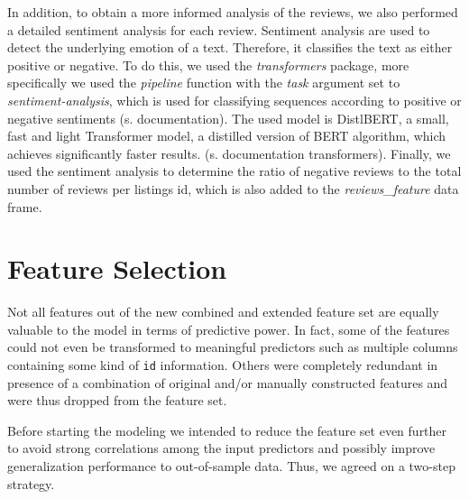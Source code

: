 \documentclass[12pt, letterpaper]{article}
\begin{document}
In addition, to obtain a more informed analysis of the reviews, we also performed a detailed sentiment analysis for each review. Sentiment analysis are used to detect the underlying emotion of a text. Therefore, it classifies the text as either positive or negative. 
To do this, we used the \textit{transformers} package, more specifically we used the \textit{pipeline} function 
with the \textit{task} argument set to \textit{sentiment-analysis}, which is used for classifying sequences
according to positive or negative sentiments (s. documentation). The used model is DistlBERT, 
a small, fast and light Transformer model, a distilled version of BERT algorithm, which achieves significantly faster results. (s. documentation transformers).
Finally, we used the sentiment analysis to determine the ratio of negative reviews to the total number of reviews per listings id, which is also added to the \textit{reviews\_feature} data frame. 



\section{Feature Selection}

Not all features out of the new combined and extended feature set are equally valuable to the model in terms of predictive power.
In fact, some of the features could not even be transformed to meaningful predictors such as multiple columns containing some kind of \texttt{id} information.
Others were completely redundant in presence of a combination of original and/or manually constructed features and were thus dropped from the feature set.

Before starting the modeling we intended to reduce the feature set even further to avoid strong correlations among the input predictors and possibly improve generalization performance to out-of-sample data.
Thus, we agreed on a two-step strategy.
\end{document}
